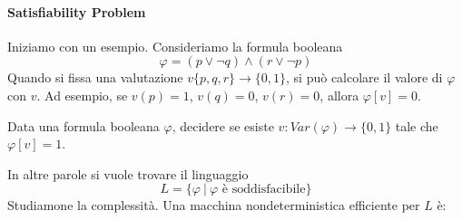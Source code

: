 \paragraph{Satisfiability Problem} Iniziamo con un esempio. Consideriamo la formula booleana 
$$
    \varphi = (p\lor\lnot q)\land(r\lor\lnot p)
$$
Quando si fissa una valutazione $v\{p,q,r\}\to\{0,1\}$, si può calcolare il valore di $\varphi$ con $v$. Ad esempio, se $v(p)=1$, $v(q)=0$, $v(r)=0$, allora $\varphi[v]=0$.

\begin{proposition}
    Data una formula booleana $\varphi$, decidere se esiste $v:Var(\varphi)\to\{0,1\}$ tale che $\varphi[v]=1$.
\end{proposition}
In altre parole si vuole trovare il linguaggio
$$
    L = \{\varphi ~|~ \varphi \text{ è soddisfacibile}\}
$$
Studiamone la complessità. Una macchina nondeterministica efficiente per $L$ è:
